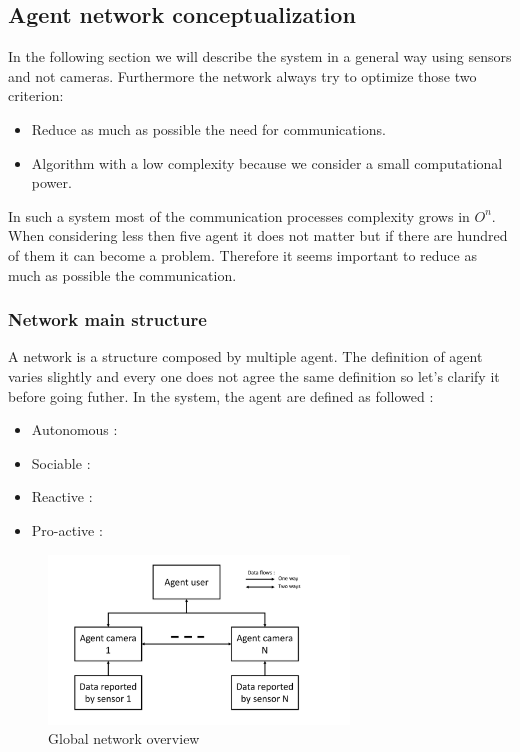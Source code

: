 \subsection{Agent network conceptualization}
\label{Agent_newtork_conceptualization}
In the following section we will describe the system in a general way using sensors and not cameras. Furthermore the network always try to optimize those two criterion:
\begin{itemize}
    \item Reduce as much as possible the need for communications.
    \item Algorithm with a low complexity because we consider a small computational power.
\end{itemize}

In such a system most of the communication processes complexity grows in $O^n$. When considering less then five agent it does not matter but if there are hundred of them it can become a problem. Therefore it seems important to reduce as much as possible the communication. 

\subsubsection{Network main structure}
A network is a structure composed by multiple agent. The definition of agent varies slightly and every one does not agree  the same definition so let's clarify it before going futher. In the system, the agent are defined as followed : 
    
\begin{itemize}
    \item Autonomous :  
    \item Sociable :
    \item Reactive :
    \item Pro-active :
\end{itemize}
 
\begin{figure}
    \centering
    \includegraphics[page=1,clip,width = 8cm]{systeme_multi_agent/conceptualization/multi_agent_schematic.pdf}
    \caption{Global network overview}
    \label{fig:Network_overview}
\end{figure}


